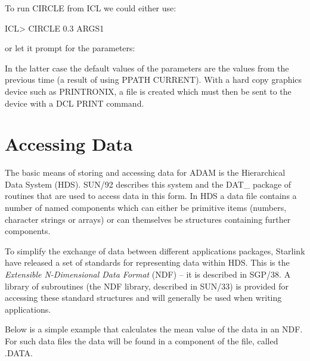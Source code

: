 \documentclass[twoside,11pt,nolof,chapters]{starlink}
\begin{document}
To run CIRCLE from ICL we could either use:

\begin{terminalv}
    ICL> CIRCLE  0.3  ARGS1
\end{terminalv}

or let it prompt for the parameters:


In the latter case the default values of the parameters are the values from the
previous time (a result of using PPATH CURRENT). With a hard copy graphics
device such as PRINTRONIX, a file is created which must then be sent to
the device with a DCL PRINT command.

\section{Accessing Data}
\label{accdat}
The basic means of storing and accessing data for ADAM is the Hierarchical
Data System (HDS). SUN/92 describes this system
and the DAT\_ package of routines that are used to access data in this form.
In HDS a data file contains a number of named components which can
either be primitive items (numbers, character strings or arrays) or can
themselves be structures containing further components.

To simplify the exchange of data between different applications packages,
Starlink have released a set of standards for representing data within HDS.
This is the \emph{Extensible N-Dimensional Data Format} (NDF) -- it is
described in SGP/38. A library of subroutines (the NDF library, described in
SUN/33) is provided for accessing these standard structures and will generally
be used when writing applications.

Below is a simple example that calculates the mean value of the data in
an NDF. For such data files the data will be found in a component
of the file, called .DATA.
\end{document}
